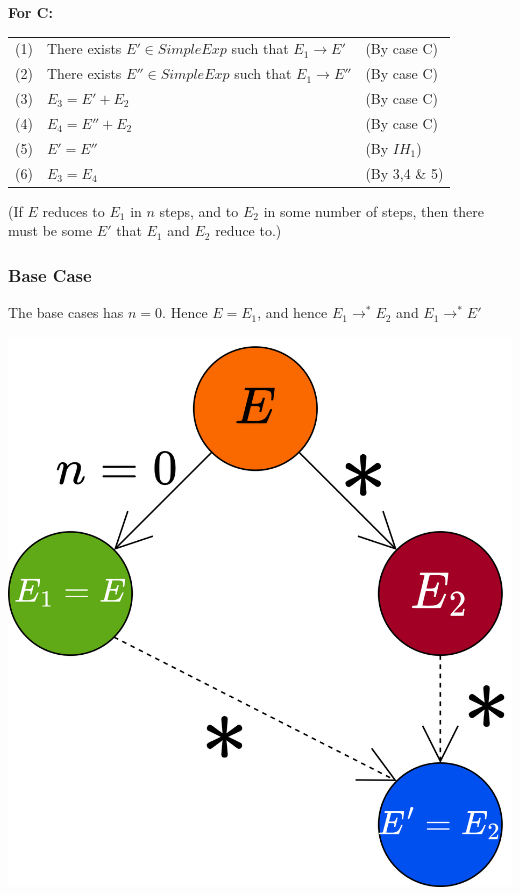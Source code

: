 \textbf{For C:}
\begin{center}
	\begin{tabular}{l l l}
		(1) & There exists $E' \in SimpleExp$ such that $E_1 \to E'$   & (By case C)   \\
		(2) & There exists $E'' \in SimpleExp$ such that $E_1 \to E''$ & (By case C)   \\
		(3) & $E_3 = E' + E_2$                                         & (By case C)   \\
		(4) & $E_4 = E'' + E_2$                                        & (By case C)   \\
		(5) & $E' = E''$                                               & (By $IH_1$)   \\
		(6) & $E_3 = E_4$                                              & (By 3,4 \& 5)
	\end{tabular}
\end{center}
(If $E$ reduces to $E_1$ in $n$ steps, and to $E_2$ in some number of steps, then there must be some $E'$ that $E_1$ and $E_2$ reduce to.)
\subsubsection*{Base Case}
The base cases has $n=0$. Hence $E = E_1$, and hence $E_1 \to^* E_2$ and $E_1 \to^* E'$
\begin{center}
	\includegraphics[scale=0.1]{structural_induction/images/confluence_base_case.drawio.png}
\end{center}
